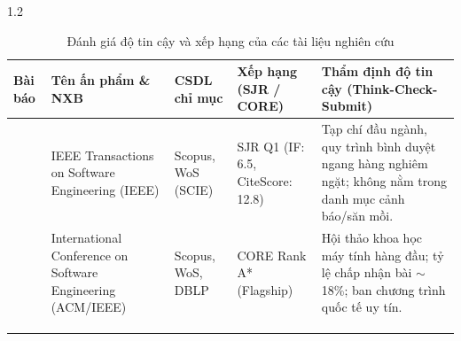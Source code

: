 \begin{spacing}{1.2}
\begin{table}[htpb]
\centering
\caption{Đánh giá độ tin cậy và xếp hạng của các tài liệu nghiên cứu}
\label{tab:danh_gia_xep_hang}
\renewcommand{\arraystretch}{1.3}
{\fontsize{10}{12}\selectfont
\begin{tabularx}{\textwidth}{|>{\centering\arraybackslash}p{1.4cm}|>{\raggedright\arraybackslash}X|>{\centering\arraybackslash}p{2.3cm}|>{\centering\arraybackslash}p{2.6cm}|>{\raggedright\arraybackslash}X|}
\hline
\textbf{Bài báo} & \textbf{Tên ấn phẩm \& NXB} & \textbf{CSDL chỉ mục} & \textbf{Xếp hạng (SJR / CORE)} & \textbf{Thẩm định độ tin cậy (Think-Check-Submit)} \\
\hline
\cite{vidu_tapchi} & IEEE Transactions on Software Engineering (IEEE) & Scopus, WoS (SCIE) & SJR Q1 (IF: 6.5, CiteScore: 12.8) & Tạp chí đầu ngành, quy trình bình duyệt ngang hàng nghiêm ngặt; không nằm trong danh mục cảnh báo/săn mồi. \\
\hline
\cite{vidu_hoinghi} & International Conference on Software Engineering (ACM/IEEE) & Scopus, WoS, DBLP & CORE Rank A* (Flagship) & Hội thảo khoa học máy tính hàng đầu; tỷ lệ chấp nhận bài $\sim$18\%; ban chương trình quốc tế uy tín. \\
\hline
[Bài báo 3] & [Điền tên Tạp chí/Hội thảo, NXB] & [Scopus / WoS] & [SJR Q1/Q2 / CORE A*/A/B] & [Điền kết quả kiểm tra Think-Check-Submit: phản biện minh bạch, NXB uy tín, chỉ mục chuẩn] \\
\hline
[Bài báo 4] & [Điền tên Tạp chí/Hội thảo, NXB] & [Scopus / WoS] & [SJR Q1/Q2 / CORE A*/A/B] & [Điền kết quả kiểm tra Think-Check-Submit: phản biện minh bạch, NXB uy tín, chỉ mục chuẩn] \\
\hline
[Bài báo 5] & [Điền tên Tạp chí/Hội thảo, NXB] & [Scopus / WoS] & [SJR Q1/Q2 / CORE A*/A/B] & [Điền kết quả kiểm tra Think-Check-Submit: phản biện minh bạch, NXB uy tín, chỉ mục chuẩn] \\
\hline
\end{tabularx}
}
\end{table}


\end{spacing}
